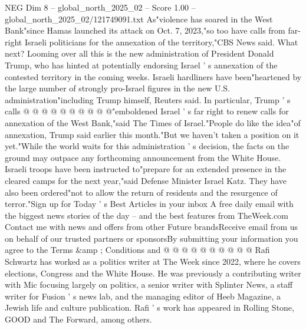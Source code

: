 \begin{textsample}{NEG Dim 8 – global\_north\_2025\_02 – Score 1.00 – global\_north\_2025\_02/121749091.txt}
As"violence has soared in the West Bank"since Hamas launched its attack on Oct. 7, 2023,"so too have calls from far-right Israeli politicians for the annexation of the territory,"CBS News said.
What next?
Looming over all this is the new administration of President Donald Trump, who has hinted at potentially endorsing Israel ' s annexation of the contested territory in the coming weeks.
Israeli hardliners have been"heartened by the large number of strongly pro-Israel figures in the new U.S. administration"including Trump himself, Reuters said.
In particular, Trump ' s calls @ @ @ @ @ @ @ @ @ @"emboldened Israel ' s far right to renew calls for annexation of the West Bank,"said The Times of Israel."People do like the idea"of annexation, Trump said earlier this month."But we haven't taken a position on it yet."While the world waits for this administration ' s decision, the facts on the ground may outpace any forthcoming announcement from the White House.
Israeli troops have been instructed to"prepare for an extended presence in the cleared camps for the next year,"said Defense Minister Israel Katz.
They have also been ordered"not to allow the return of residents and the resurgence of terror."Sign up for Today ' s Best Articles in your inbox A free daily email with the biggest news stories of the day -- and the best features from TheWeek.com Contact me with news and offers from other Future brandsReceive email from us on behalf of our trusted partners or sponsorsBy submitting your information you agree to the Terms \&amp ; Conditions and @ @ @ @ @ @ @ @ @ @ Rafi Schwartz has worked as a politics writer at The Week since 2022, where he covers elections, Congress and the White House.
He was previously a contributing writer with Mic focusing largely on politics, a senior writer with Splinter News, a staff writer for Fusion ' s news lab, and the managing editor of Heeb Magazine, a Jewish life and culture publication.
Rafi ' s work has appeared in Rolling Stone, GOOD and The Forward, among others.

\end{textsample}
